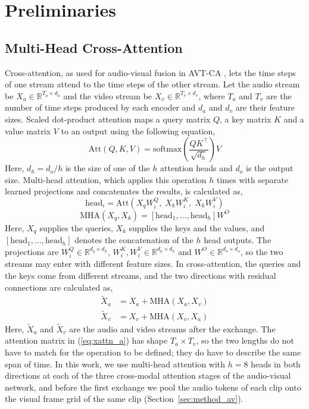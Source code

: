 \documentclass[journal]{IEEEtran}
\begin{document}
\section{Preliminaries}
\label{sec:prelim}

\subsection{Multi-Head Cross-Attention}
\label{sec:prelim_mha}

Cross-attention, as used for audio-visual fusion in AVT-CA \cite{venkatraman2025avtca}, lets the time steps of one stream attend to the time steps of the other stream. Let the audio stream be $X_a \in \mathbb{R}^{T_a \times d_a}$ and the video stream be $X_v \in \mathbb{R}^{T_v \times d_v}$, where $T_a$ and $T_v$ are the number of time steps produced by each encoder and $d_a$ and $d_v$ are their feature sizes. Scaled dot-product attention maps a query matrix $Q$, a key matrix $K$ and a value matrix $V$ to an output using the following equation,
\begin{equation}
\mathrm{Att}(Q,K,V) = \mathrm{softmax}\!\left(\frac{QK^{\top}}{\sqrt{d_h}}\right) V
\end{equation}
Here, $d_h = d_o / h$ is the size of one of the $h$ attention heads and $d_o$ is the output size. Multi-head attention, which applies this operation $h$ times with separate learned projections and concatenates the results, is calculated as,
\begin{equation}
\mathrm{head}_i = \mathrm{Att}\!\left(X_q W_i^{Q},\; X_k W_i^{K},\; X_k W_i^{V}\right)
\end{equation}
\begin{equation}
\mathrm{MHA}(X_q, X_k) = \left[\mathrm{head}_1, \ldots, \mathrm{head}_h\right] W^{O}
\end{equation}
Here, $X_q$ supplies the queries, $X_k$ supplies the keys and the values, and $\left[\mathrm{head}_1, \ldots, \mathrm{head}_h\right]$ denotes the concatenation of the $h$ head outputs. The projections are $W_i^{Q} \in \mathbb{R}^{d_q \times d_h}$, $W_i^{K}, W_i^{V} \in \mathbb{R}^{d_k \times d_h}$ and $W^{O} \in \mathbb{R}^{d_o \times d_o}$, so the two streams may enter with different feature sizes. In cross-attention, the queries and the keys come from different streams, and the two directions with residual connections are calculated as,
\begin{align}
\tilde{X}_a &= X_a + \mathrm{MHA}(X_a, X_v) \label{eq:xattn_a}\\
\tilde{X}_v &= X_v + \mathrm{MHA}(X_v, X_a) \label{eq:xattn_v}
\end{align}
Here, $\tilde{X}_a$ and $\tilde{X}_v$ are the audio and video streams after the exchange. The attention matrix in (\ref{eq:xattn_a}) has shape $T_a \times T_v$, so the two lengths do not have to match for the operation to be defined; they do have to describe the same span of time. In this work, we use multi-head attention with $h = 8$ heads in both directions at each of the three cross-modal attention stages of the audio-visual network, and before the first exchange we pool the audio tokens of each clip onto the visual frame grid of the same clip (Section~\ref{sec:method_av}).
\end{document}

